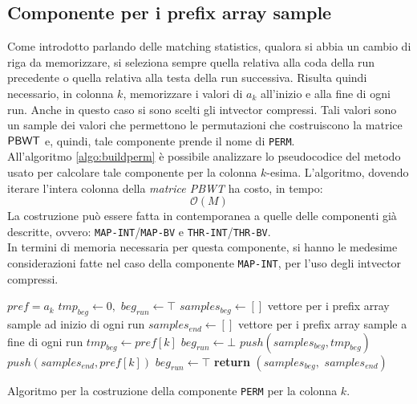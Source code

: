 \subsection{Componente per i prefix array sample}
Come introdotto parlando delle matching statistics, qualora si abbia un
cambio di riga da memorizzare, si seleziona sempre quella relativa alla coda
della run precedente o quella relativa alla testa della run successiva. Risulta
quindi necessario, in colonna $k$, memorizzare i valori di $a_k$ all'inizio e
alla fine di ogni run. Anche in questo caso si sono scelti gli intvector
compressi. Tali valori sono un sample dei valori che permettono 
le permutazioni che costruiscono la matrice $\mbox{\rm {\sf PBWT}}$ e, quindi, tale
componente prende il nome di \texttt{PERM}.\\
All'algoritmo \ref{algo:buildperm} è possibile analizzare lo pseudocodice del
metodo usato per calcolare tale componente per la colonna
$k$-esima. L'algoritmo, dovendo iterare l'intera colonna della \textit{matrice
  PBWT} ha costo, in tempo:
\begin{equation}
  \label{eq:timeperm}
  \mathcal{O}(M)
\end{equation}
La costruzione può essere fatta in contemporanea a quelle delle componenti già
descritte, ovvero: 
\texttt{MAP-INT}/\texttt{MAP-BV} e \texttt{THR-INT}/\texttt{THR-BV}.\\
\noindent
In termini di memoria necessaria per questa componente, si hanno le medesime
considerazioni fatte nel caso della componente \texttt{MAP-INT}, per l'uso degli
intvector compressi.
\begin{algorithm}
  \small
  \begin{algorithmic}[1]
    \Comment $pref = a_k$
    \State $tmp_{beg}\gets 0,\,\,beg_{run}\gets \top$
    \State $samples_{beg} \gets []$
    \Comment vettore per i prefix array sample ad inizio di ogni run
    \State $samples_{end}\gets []$
    \Comment vettore per i prefix array sample a fine di ogni run
    \For {\textit{every} $k\in\left[0,\,\, height\right)$}
    \State $tmp_{beg}\gets pref[k]$
    \State $beg_{run}\gets \bot$
    \EndIf
    \State $push(samples_{beg}, tmp_{beg})$
    \State $push(samples_{end}, pref[k])$
    \State $beg_{run}\gets \top$
    \EndIf
    \EndFor
    \State \textbf{return} $(samples_{beg},\,\, samples_{end})$  
    \EndFunction
  \end{algorithmic}
  \caption{{\footnotesize{Algoritmo per la costruzione della componente
  \texttt{PERM} per la colonna $k$.}}}
  \label{algo:buildperm}
\end{algorithm}